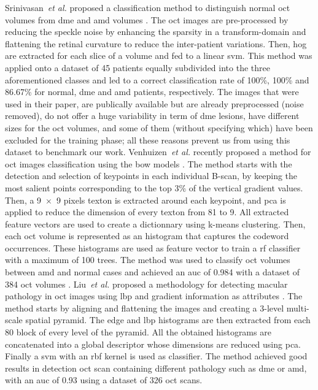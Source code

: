 Srinivasan~\textit{et al.} proposed a classification method to distinguish normal \gls{oct} volumes from \gls{dme} and \gls{amd} volumes \cite{srinivasan2014fully}.
The \gls{oct} images are pre-processed by reducing the speckle noise by enhancing the sparsity in a transform-domain and flattening the retinal curvature to reduce the inter-patient variations.
Then, \gls{hog} are extracted for each slice of a volume and fed to a linear \gls{svm}.
This method was applied onto a dataset of 45 patients equally subdivided into the three aforementioned classes and led to a correct classification rate of 100\%, 100\% and 86.67\% for normal, \gls{dme} and \gls{amd} patients, respectively.
The images that were used in their paper, are publically available but are already preprocessed (noise removed), do not offer a huge variability in term of \gls{dme} lesions, have different sizes for the \gls{oct} volumes, and some of them (without specifying which) have been excluded for the training phase; all these reasons prevent us from using this dataset to benchmark our work.
Venhuizen~\textit{et al.} recently proposed a method for \gls{oct} images classification using the \gls{bow} models \cite{Sivic2003}.
The method starts with the detection and selection of keypoints in each individual B-scan, by keeping the most salient points corresponding to the top 3\% of the vertical gradient values.
Then, a 9~$\times$~9 pixels texton is extracted around each keypoint, and \gls{pca} is applied to reduce the dimension of every texton from 81 to 9. 
All extracted feature vectors are used to create a dictionnary using k-means clustering.
Then, each \gls{oct} volume is represented as an histogram that captures the codeword occurrences.
These histograms are used as feature vector to train a \gls{rf} classifier with a maximum of 100 trees.
The method was used to classify \gls{oct} volumes between \gls{amd} and normal cases and achieved an \gls{auc} of 0.984 with a dataset of 384 \gls{oct} volumes \cite{venhuizen2015automated}.
Liu~\textit{et al.} proposed a methodology for detecting macular pathology in \gls{oct} images using \gls{lbp} and gradient information as attributes \cite{liu2011automated}.
The method starts by aligning and flattening the images and creating a 3-level multi-scale spatial pyramid.
The edge and \gls{lbp} histograms are then extracted from each 80 block of every level of the pyramid.
All the obtained histograms are concatenated into a global descriptor whose dimensions are reduced using \gls{pca}.
Finally a \gls{svm} with an \gls{rbf} kernel is used as classifier.
The method achieved good results in detection \gls{oct} scan containing different pathology such as \gls{dme} or \gls{amd}, with an \gls{auc} of 0.93 using a dataset of 326 \gls{oct} scans.
